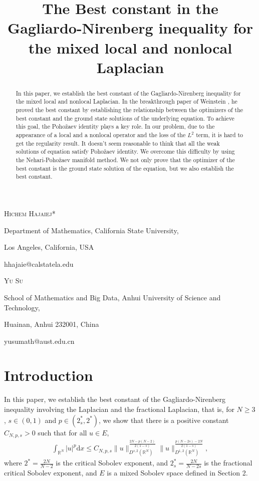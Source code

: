 \documentclass[12pt,a4paper,reqno]{amsart}
\title[Schr\"{o}dinger equation with local and nonlocal operator]
{The Best constant in the Gagliardo-Nirenberg inequality for the mixed local and nonlocal Laplacian}
\numberwithin{equation}{section}
\begin{document}
\maketitle

\centerline{\scshape Hichem Hajaiej*}
\medskip
{\footnotesize
\centerline{Department of Mathematics, California State University,}
\centerline{Los Angeles, California, USA}
\centerline{hhajaie@calstatela.edu}
}

\medskip

\centerline{\scshape Yu Su}
\medskip
{\footnotesize
\centerline{School of Mathematics and Big Data, Anhui University of Science and Technology,}
\centerline{Huainan, Anhui 232001, China}
\centerline{yusumath@aust.edu.cn}
}


\begin{abstract}
In this paper, we establish the best constant of the Gagliardo-Nirenberg inequality for the mixed local and nonlocal Laplacian.
In the breakthrough paper of Weinstein \cite{Weinstein1983CMP},
he proved the best constant by establishing the relationship between the optimizers of the best constant and the ground state solutions of the underlying equation.
To achieve this goal, the Poho\v{z}aev identity plays a key role.
In our problem, due to the appearance of a local and a nonlocal operator and the loss of the $L^{2}$ term,
it is hard to get the regularity result.
It doesn't seem reasonable to think that all the weak solutions of equation satisfy Poho\v{z}aev identity.
We overcome this difficulty by using the Nehari-Poho\v{z}aev manifold method.
We not only prove that the optimizer of the best constant is the ground state solution of the equation, but we also establish the best constant.
\end{abstract}

\section{Introduction}
In this paper, we establish the best constant of the Gagliardo-Nirenberg inequality involving the Laplacian and the fractional Laplacian, that is, for $N\geqslant3$, $s\in(0,1)$ and $p\in (2^{*}_{s},2^{*})$, we show that there is a positive constant $C_{N,p,s}>0$ such that for all $u\in E$,
\begin{equation}\label{GN}
\begin{aligned}
\int_{\mathbb{R}^{N}}
|u|^{p}
\mathrm{d}x
\leqslant
C_{N,p,s}
\|u\|_{D^{s,2}(\mathbb{R}^{N})}^{\frac{2N-p(N-2)}{2(1-s)}}
\|u\|_{D^{1,2}(\mathbb{R}^{N})}^{\frac{p(N-2s)-2N}{2(1-s)}},
\end{aligned}
\tag{$GN$}
\end{equation}
where $2^{*}=\frac{2N}{N-2}$ is the critical Sobolev exponent, and $2_{s}^{*}=\frac{2N}{N-2s}$ is the  fractional critical Sobolev exponent, and $E$ is a mixed Sobolev space  defined in Section 2.
\end{document}

